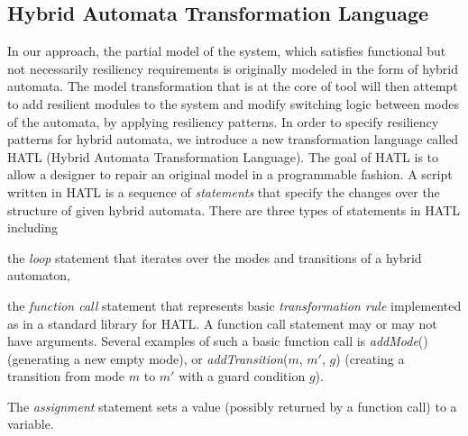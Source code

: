 \subsection{Hybrid Automata Transformation Language}
In our approach, the partial model of the system, which satisfies functional but not necessarily resiliency requirements is originally modeled in the form of hybrid automata. The model transformation that is at the core of \toolreaffirm tool will then attempt to add resilient modules to the system and modify switching logic between modes of the automata, by applying resiliency patterns. 
%
%
%
In order to specify resiliency patterns for hybrid automata, we introduce a new transformation language called HATL (Hybrid Automata Transformation Language). The goal of HATL is to allow a designer to repair an original model in a programmable fashion. A script written in HATL is a sequence of \emph{statements} that specify the changes over the structure of given hybrid automata. There are three types of statements in HATL including
\begin{inparaenum}[(a)]
\item the \emph{loop} statement that iterates over the modes and transitions of a hybrid automaton,
\item the \emph{function call} statement that represents basic \emph{transformation rule} implemented as in a standard library for HATL. A function call statement may or may not have arguments. Several examples of such a basic function call is \emph{addMode}() (\ie generating a new empty mode), or \emph{addTransition}($m$, $m'$, $g$) (\ie creating a transition from mode $m$ to $m'$ with a guard condition $g$).
\item The \emph{assignment} statement sets a value (possibly returned by a function call) to a variable.
\end{inparaenum}
%

%


